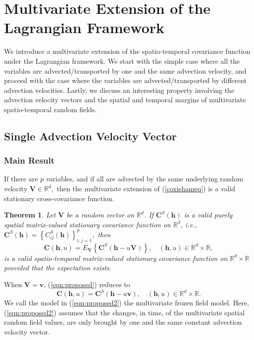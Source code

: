 \documentclass[12pt]{article}
\newcommand{\0}{\mathbf{0}}
\newtheorem{theo}{Theorem}
\begin{document}
\section{Multivariate Extension of the Lagrangian Framework}\label{sec:proposed}

We introduce a multivariate extension of the spatio-temporal covariance function under the Lagrangian framework. We start with the simple case where all the variables are advected/transported by one and the same advection velocity, and proceed with the case where the variables are advected/transported by different advection velocities. Lastly, we discuss an interesting property involving the advection velocity vectors and the spatial and temporal margins of multivariate spatio-temporal random fields.

\subsection{Single Advection Velocity Vector}

\subsubsection{Main Result}

If there are $p$ variables, and if all are advected by the same underlying random velocity $\mathbf{V} \in \mathbb{R}^d,$ then the multivariate extension of (\ref{coxishameq}) is a valid stationary cross-covariance function. 
\begin{theo} \label{theorem1}
Let $\mathbf{V}$ be a random vector on $\mathbb{R}^d$. If $\mathbf{C}^{S}(\mathbf{h})$ is a valid purely spatial matrix-valued stationary covariance function on $\mathbb{R}^d$, i.e., $\mathbf{C}^{S}(\mathbf{h})=\left\{C_{ij}^{S}(\mathbf{h})\right\}_{i,j=1}^{p},$ then
\begin{equation} \label{eqn:proposed}
\mathbf{C}(\mathbf{h}, u)=E_{\mathbf{V}}\left\{\mathbf{C}^S(\mathbf{h}-u\mathbf{V})\right\},\quad (\mathbf{h},u)\in \mathbb{R}^d \times \mathbb{R},
\end{equation}
is a valid spatio-temporal matrix-valued stationary covariance function on $\mathbb{R}^d \times \mathbb{R}$ provided that the expectation exists.
\end{theo}
When $\mathbf{V}=\mathbf{v}$, (\ref{eqn:proposed}) reduces to 
\begin{equation} \label{eqn:proposed2}
\mathbf{C}(\mathbf{h}, u)=\mathbf{C}^S(\mathbf{h}-u\mathbf{v}),\quad (\mathbf{h},u)\in \mathbb{R}^d \times \mathbb{R}.
\end{equation}
We call the model in (\ref{eqn:proposed2}) the multivariate frozen field model. Here, (\ref{eqn:proposed2}) assumes that the changes, in time, of the multivariate spatial random field values, are only brought by one and the same constant advection velocity vector. 
\end{document}
